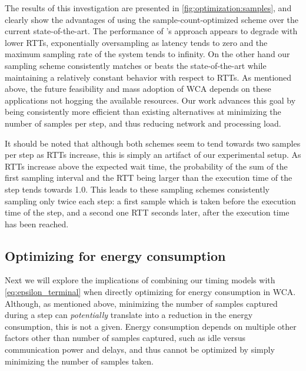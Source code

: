 The results of this investigation are presented in \cref{fig:optimization:samples}, and clearly show the advantages of using the sample-count-optimized scheme over the current state-of-the-art.
The performance of \textcite{wang2019towards}'s approach appears to degrade with lower \glspl{RTT}, exponentially oversampling as latency tends to zero and the maximum sampling rate of the system tends to infinity.
On the other hand our sampling scheme consistently matches or beats the state-of-the-art while maintaining a relatively constant behavior with respect to \glspl{RTT}.
As mentioned above, the future feasibility and mass adoption of \gls{WCA} depends on these applications not hogging the available resources.
Our work advances this goal by being consistently more efficient than existing alternatives at minimizing the number of samples per step, and thus reducing network and processing load.

It should be noted that although both schemes seem to tend towards two samples per step as \glspl{RTT} increase, this is simply an artifact of our experimental setup.
As \glspl{RTT} increase above the expected wait time, the probability of the sum of the first sampling interval and the \gls{RTT} being larger than the execution time of the step tends towards \num{1.0}.
This leads to these sampling schemes consistently sampling only twice each step: a first sample which is taken before the execution time of the step, and a second one \gls{RTT} seconds later, after the execution time has been reached.

\subsection{Optimizing for energy consumption}\label{ssec:optimization:energy}

Next we will explore the implications of combining our timing models with \cref{eq:epsilon_terminal} when directly optimizing for energy consumption in \gls{WCA}.
Although, as mentioned above, minimizing the number of samples captured during a step can \emph{potentially} translate into a reduction in the energy consumption, this is not a given.
Energy consumption depends on multiple other factors other than number of samples captured, such as idle versus communication power and delays, and thus cannot be optimized by simply minimizing the number of samples taken.

